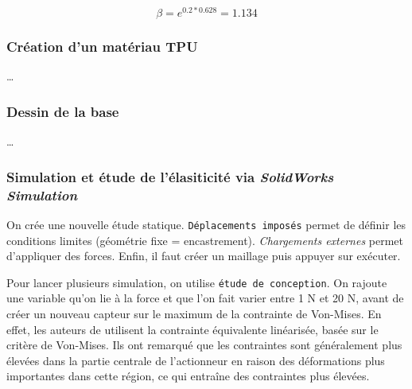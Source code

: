 \documentclass[a4paper, 11pt]{report}
\begin{document}
            \[
            \beta = e^{0.2 * 0.628} = 1.134
            \]

        \subsubsection{Création d'un matériau TPU}

        \dots

        \subsubsection{Dessin de la base}

        \dots

        \subsubsection{Simulation et étude de l'élasiticité via \textit{SolidWorks Simulation}}

            On crée une nouvelle étude statique. \texttt{Déplacements imposés} permet de définir les conditions limites (géométrie fixe = encastrement). \textit{Chargements externes} permet d'appliquer des forces. Enfin, il faut créer un maillage puis appuyer sur exécuter.

            Pour lancer plusieurs simulation, on utilise \texttt{étude de conception}. On rajoute une variable qu'on lie à la force et que l'on fait varier entre 1 N et 20 N, avant de créer un nouveau capteur sur le maximum de la contrainte de Von-Mises. En effet, les auteurs de \cite{bhat_numerical_2025} utilisent la contrainte équivalente linéarisée, basée sur le critère de Von-Mises. Ils ont remarqué que les contraintes sont généralement plus élevées dans la partie centrale de l'actionneur en raison des déformations plus importantes dans cette région, ce qui entraîne des contraintes plus élevées.
        
    
    
\end{document}
